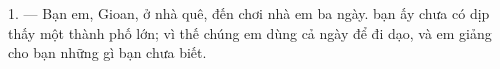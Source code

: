 %
%
%
%
%
%

\VUsaut{4.0mm}
\VUsaut{3.0mm}

\VUsaut{3.0mm}

1. --- Bạn em, Gioan, ở nhà quê, đến chơi nhà em ba ngày.  bạn ấy
chưa có dịp thấy một thành phố lớn; vì thế chúng em dùng cả ngày để đi dạo, và em giảng
cho bạn những gì bạn chưa biết.

